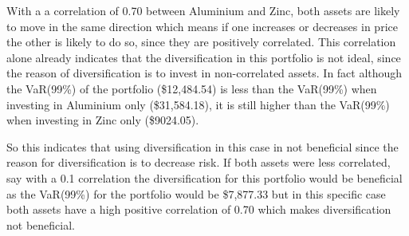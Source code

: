 \noindent
With a a correlation of 0.70 between Aluminium and Zinc, both assets are likely to move in the same direction which means if one increases or decreases in price the other is likely to do so, since they are positively correlated. This correlation alone already indicates that the diversification in this portfolio is not ideal, since the reason of diversification is to invest in non-correlated assets. In fact although the VaR(99\%) of the portfolio (\$12,484.54) is less than the VaR(99\%) when investing in Aluminium only (\$31,584.18), it is still higher than the VaR(99\%) when investing in Zinc only (\$9024.05). 

\noindent
So this indicates that using diversification in this case in not beneficial since the reason for diversification is to decrease risk. If both assets were less correlated, say with a 0.1 correlation the diversification for this portfolio would be beneficial as the VaR(99\%) for the portfolio would be \$7,877.33 but in this specific case both assets have a high positive correlation of 0.70 which makes diversification not beneficial. 

